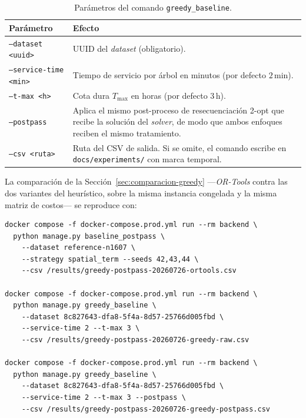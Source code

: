 \begin{table}[H]
  \centering
  \caption{Parámetros del comando \texttt{greedy\_baseline}.}
  \label{tab:anexo_greedy_baseline}
  \small
  \begin{tabularx}{\textwidth}{@{}p{5.5cm} X@{}}
    \toprule
    Parámetro &
      Efecto \\
    \midrule
    \texttt{--dataset <uuid>} &
      UUID del \textit{dataset} (obligatorio). \\
    \texttt{--service-time <min>} &
      Tiempo de servicio por árbol en minutos (por defecto $2$\,min). \\
    \texttt{--t-max <h>} &
      Cota dura $T_{\max}$ en horas (por defecto $3$\,h). \\
    \texttt{--postpass} &
      Aplica el mismo post-proceso de resecuenciación 2-opt que recibe la solución del
      \textit{solver}, de modo que ambos enfoques reciben el mismo tratamiento. \\
    \texttt{--csv <ruta>} &
      Ruta del CSV de salida. Si se omite, el comando escribe en \texttt{docs/experiments/}
      con marca temporal. \\
    \bottomrule
  \end{tabularx}
\end{table}

La comparación de la Sección~\ref{sec:comparacion-greedy} ---\textit{OR-Tools} contra las dos
variantes del heurístico, sobre la misma instancia congelada y la misma matriz de costos--- se
reproduce con:

\begin{verbatim}
docker compose -f docker-compose.prod.yml run --rm backend \
  python manage.py baseline_postpass \
    --dataset reference-n1607 \
    --strategy spatial_term --seeds 42,43,44 \
    --csv /results/greedy-postpass-20260726-ortools.csv

docker compose -f docker-compose.prod.yml run --rm backend \
  python manage.py greedy_baseline \
    --dataset 8c827643-dfa8-5f4a-8d57-25766d005fbd \
    --service-time 2 --t-max 3 \
    --csv /results/greedy-postpass-20260726-greedy-raw.csv

docker compose -f docker-compose.prod.yml run --rm backend \
  python manage.py greedy_baseline \
    --dataset 8c827643-dfa8-5f4a-8d57-25766d005fbd \
    --service-time 2 --t-max 3 --postpass \
    --csv /results/greedy-postpass-20260726-greedy-postpass.csv
\end{verbatim}

